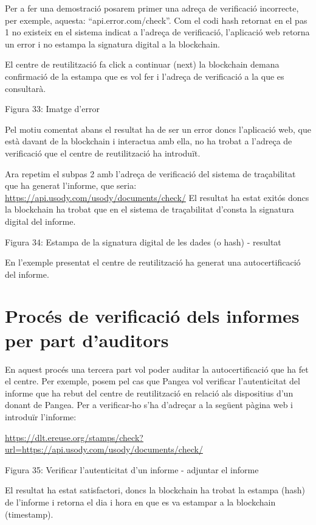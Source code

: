 \documentclass[
]{book}
\begin{document}
Per a fer una demostració posarem primer una adreça de verificació incorrecte, per exemple, aquesta: ``api.error.com/check''. Com el codi hash retornat en el pas 1 no existeix en el sistema indicat a l'adreça de verificació, l'aplicació web retorna un error i no estampa la signatura digital a la blockchain.

El centre de reutilització fa click a continuar (next) la blockchain demana confirmació de la estampa que es vol fer i l'adreça de verificació a la que es consultarà.

Figura 33: Imatge d'error

Pel motiu comentat abans el resultat ha de ser un error doncs l'aplicació web, que està davant de la blockchain i interactua amb ella, no ha trobat a l'adreça de verificació que el centre de reutilització ha introduït.

Ara repetim el subpas 2 amb l'adreça de verificació del sistema de traçabilitat que ha generat l'informe, que seria:
\url{https://api.usody.com/usody/documents/check/}
El resultat ha estat exitós doncs la blockchain ha trobat que en el sistema de traçabilitat
d'consta la signatura digital del informe.

Figura 34: Estampa de la signatura digital de les dades (o hash) - resultat

En l'exemple presentat el centre de reutilització ha generat una autocertificació del informe.

\hypertarget{procuxe9s-de-verificaciuxf3-dels-informes-per-part-dauditors}{%
\section{Procés de verificació dels informes per part d'auditors}\label{procuxe9s-de-verificaciuxf3-dels-informes-per-part-dauditors}}

En aquest procés una tercera part vol poder auditar la autocertificació que ha fet el centre. Per exemple, posem pel cas que Pangea vol verificar l'autenticitat del informe que ha rebut del centre de reutilització en relació als dispositius d'un donant de Pangea. Per a verificar-ho s'ha d'adreçar a la següent pàgina web i introduïr l'informe:

\url{https://dlt.ereuse.org/stamps/check?url=https://api.usody.com/usody/documents/check/}

Figura 35: Verificar l'autenticitat d'un informe - adjuntar el informe

El resultat ha estat satisfactori, doncs la blockchain ha trobat la estampa (hash) de l'informe i
retorna el dia i hora en que es va estampar a la blockchain (timestamp).
\end{document}
